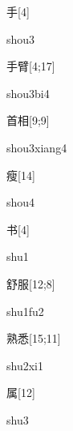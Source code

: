 \begin{verbete}[shou3]{手}[4]
\begin{pronuncia}{shou3}
\end{pronuncia}
\end{verbete}

\begin{verbete}[shou3bi4]{手臂}[4;17]
\begin{pronuncia}{shou3bi4}
\end{pronuncia}
\end{verbete}

\begin{verbete}{首相}[9;9]
\begin{pronuncia}{shou3xiang4}
\end{pronuncia}
\end{verbete}

\begin{verbete}[shou4]{瘦}[14]
\begin{pronuncia}{shou4}
\end{pronuncia}
\end{verbete}

\begin{verbete}[shu1]{书}[4]
\begin{pronuncia}{shu1}
\end{pronuncia}
\end{verbete}

\begin{verbete}[shu1fu2]{舒服}[12;8]
\begin{pronuncia}{shu1fu2}
\end{pronuncia}
\end{verbete}

\begin{verbete}[shu2xi1]{熟悉}[15;11]
\begin{pronuncia}{shu2xi1}
\end{pronuncia}
\end{verbete}

\begin{verbete}[shu3]{属}[12]
\begin{pronuncia}{shu3}
\end{pronuncia}
\end{verbete}

